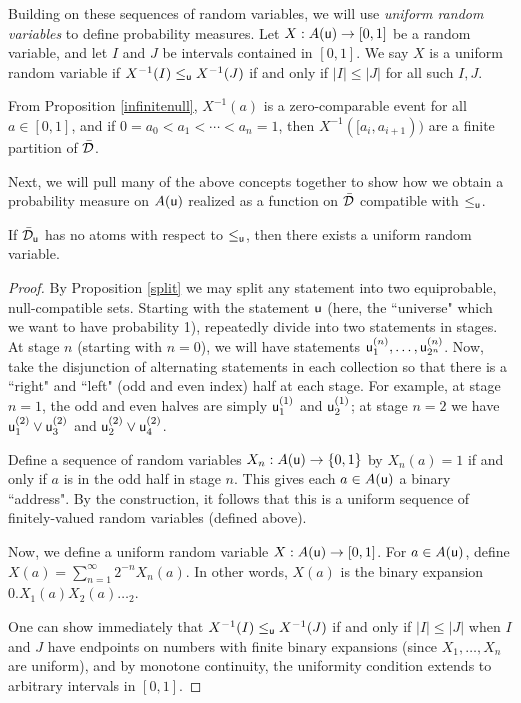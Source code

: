 \documentclass[11pt]{article}
\begin{document}
Building on these sequences of random variables, we will use \emph{uniform random variables} to define probability measures. Let $X:A({\stmt[u]})\to[0,1]$ be a random variable, and let $I$ and $J$ be intervals contained in $[0,1]$. We say $X$ is a uniform random variable if $X^{-1}(I)\lequ X^{-1}(J)$ if and only if $|I|\leq|J|$ for all such $I,J$. 

From Proposition \ref{infinitenull}, $X^{-1}(a)$ is a zero-comparable event for all $a\in[0,1]$, and if $0=a_0<a_1<\cdots<a_n=1$, then $X^{-1}([a_i,a_{i+1}))$ are a finite partition of $\tdomain$. 

Next, we will pull many of the above concepts together to show how we obtain a probability measure on $A({\stmt[u]})$ realized as a function on $\tdomain$ compatible with $\lequ$. 

\begin{prop}\label{uniformexist}
If $\tdomain_{\stmt[u]}$ has no atoms with respect to $\lequ$, then there exists a uniform random variable.
\end{prop}
\begin{proof}
By Proposition \ref{split} we may split any statement into two equiprobable, null-compatible sets. Starting with the statement $\stmt[u]$ (here, the ``universe" which we want to have probability 1), repeatedly divide into two statements in stages. At stage $n$ (starting with $n=0$), we will have statements $\stmt[u]^{(n)}_1,\ldots,\stmt[u]^{(n)}_{2^n}$. Now, take the disjunction of alternating statements in each collection so that there is a ``right" and ``left" (odd and even index) half at each stage. For example, at stage $n=1$, the odd and even halves are simply $\stmt[u]^{(1)}_1$ and $\stmt[u]^{(1)}_2$; at stage $n=2$ we have $\stmt[u]^{(2)}_1\OR\stmt[u]^{(2)}_3$ and $\stmt[u]^{(2)}_2\OR\stmt[u]^{(2)}_4$. 

Define a sequence of random variables $X_n:A(\stmt[u])\to\{0,1\}$ by $X_n(a) = 1$ if and only if $a$ is in the odd half in stage $n$. This gives each $a\in A(\stmt[u])$ a binary ``address". By the construction, it follows that this is a uniform sequence of finitely-valued random variables (defined above). 

Now, we define a uniform random variable $X:A(\stmt[u])\to[0,1]$. For $a\in A(\stmt[u])$, define $X(a) = \sum_{n=1}^{\infty}2^{-n}X_n(a)$. In other words, $X(a)$ is the binary expansion $0.X_1(a)X_2(a)\ldots_2$. 

One can show immediately that $X^{-1}(I)\lequ X^{-1}(J)$ if and only if $|I|\leq |J|$ when $I$ and $J$ have endpoints on numbers with finite binary expansions (since $X_1,\ldots,X_n$ are uniform), and by monotone continuity, the uniformity condition extends to arbitrary intervals in $[0,1]$. 
\end{proof}
\end{document}
